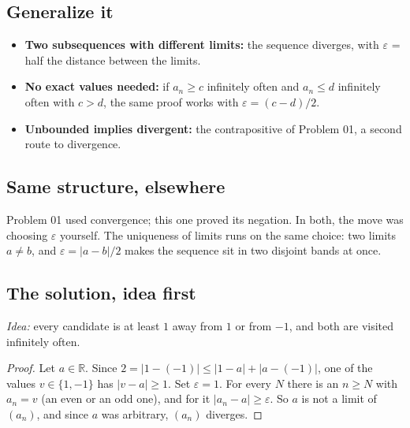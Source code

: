 \documentclass{kaelearn}
\begin{document}
\subsection{Generalize it}
\begin{itemize}
  \item \textbf{Two subsequences with different limits:} the sequence diverges, with
        $\varepsilon$ = half the distance between the limits.
  \item \textbf{No exact values needed:} if $a_n\ge c$ infinitely often and $a_n\le d$ infinitely
        often with $c>d$, the same proof works with $\varepsilon=(c-d)/2$.
  \item \textbf{Unbounded implies divergent:} the contrapositive of Problem 01, a second route to
        divergence.
\end{itemize}

\subsection{Same structure, elsewhere}
Problem 01 used convergence; this one proved its negation. In both, the move was choosing
$\varepsilon$ yourself. The uniqueness of limits runs on the same choice: two limits $a\neq b$, and
$\varepsilon=|a-b|/2$ makes the sequence sit in two disjoint bands at once.



\subsection{The solution, idea first}
\emph{Idea:} every candidate is at least $1$ away from $1$ or from $-1$, and both are visited
infinitely often.
\begin{proof}
Let $a\in\mathbb{R}$. Since $2=|1-(-1)|\le|1-a|+|a-(-1)|$, one of the values $v\in\{1,-1\}$ has
$|v-a|\ge1$. Set $\varepsilon=1$. For every $N$ there is an $n\ge N$ with $a_n=v$ (an even or an odd
one), and for it $|a_n-a|\ge\varepsilon$. So $a$ is not a limit of $(a_n)$, and since $a$ was
arbitrary, $(a_n)$ diverges.
\end{proof}
\end{document}
